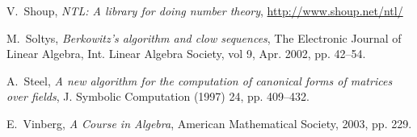 \documentclass{sig-alternate-05-2015}
\begin{document}
{\begin{thebibliographyy}{99}
V.~Shoup, {\em NTL: A library for doing number theory}, \url{http://www.shoup.net/ntl/}

M.~Soltys, {\em Berkowitz's algorithm and clow sequences}, The Electronic Journal of Linear Algebra, Int. Linear Algebra Society, vol 9, Apr. 2002, pp. 42--54.

A.~Steel, {\em A new algorithm for the computation of canonical forms of matrices over fields}, J. Symbolic
Computation (1997) 24, pp. 409--432.

E.~Vinberg, {\em A Course in Algebra}, American Mathematical Society, 2003, pp. 229.

%
%
\end{thebibliographyy}}
\end{document}
